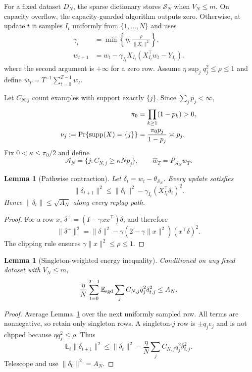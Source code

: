 \documentclass[letterpaper]{article}
\newtheorem{lemma}[theorem]{Lemma}
\newcommand{\E}{\mathbb E}
\newcommand{\cA}{\mathcal A}
\newcommand{\cS}{\mathcal S}
\newcommand{\1}{\mathbf 1}
\begin{document}
For a fixed dataset $D_N$, the sparse dictionary stores $\cS_N$ when
$V_N\le m$. On capacity overflow, the capacity-guarded algorithm outputs zero.
Otherwise, at update $t$ it samples $I_t$ uniformly from $\{1,\ldots,N\}$ and
uses
\begin{align*}
\gamma_i&=\min\left\{\eta,\frac{\rho}{\|X_i\|^2}\right\},\\
w_{t+1}&=w_t-\gamma_{I_t}X_{I_t}
(X_{I_t}^\top w_t-Y_{I_t}).
\end{align*}
where the second argument is $+\infty$ for a zero row. Assume
$\eta\sup_jq_j^2\le\rho\le1$ and define
$\bar w_T=T^{-1}\sum_{t=0}^{T-1}w_t$.

Let $C_{N,j}$ count examples with support exactly $\{j\}$. Since
$\sum_jp_j<\infty$,
\begin{align*}
\pi_0&=\prod_{k\ge1}(1-p_k)>0,\\
\nu_j:=\Pr\{{\rm supp}(X)=\{j\}\}
&=\frac{\pi_0p_j}{1-p_j}\asymp p_j.
\end{align*}
Fix $0<\kappa\le\pi_0/2$ and define
\[
\cA_N=\{j:C_{N,j}\ge\kappa Np_j\},
\qquad
\widehat w_T=P_{\cA_N}\bar w_T.
\]

\begin{lemma}[Pathwise contraction]
\label{lem:pathwise}
Let $\delta_t=w_t-\theta_{\cS_N}$. Every update satisfies
\[
\|\delta_{t+1}\|^2
\le
\|\delta_t\|^2-\gamma_{I_t}(X_{I_t}^\top\delta_t)^2.
\]
Hence $\|\delta_t\|\le\sqrt{A_N}$ along every replay path.
\end{lemma}

\begin{proof}
For a row $x$,
$\delta^+=(I-\gamma xx^\top)\delta$, and therefore
\[
\|\delta^+\|^2
=\|\delta\|^2-
\gamma(2-\gamma\|x\|^2)(x^\top\delta)^2.
\]
The clipping rule ensures $\gamma\|x\|^2\le\rho\le1$.
\end{proof}

\begin{lemma}[Singleton-weighted energy inequality]
\label{lem:energy}
Conditioned on any fixed dataset with $V_N\le m$,
\begin{equation}
\frac{\eta}{N}
\sum_{t=0}^{T-1}\E_{\rm sgd}
\sum_jC_{N,j}q_j^2\delta_{t,j}^2
\le A_N.
\label{eq:supp-energy}
\end{equation}
\end{lemma}

\begin{proof}
Average Lemma~\ref{lem:pathwise} over the next uniformly sampled row. All
terms are nonnegative, so retain only singleton rows. A singleton-$j$ row is
$\pm q_je_j$ and is not clipped because $\eta q_j^2\le\rho$. Thus
\[
\E_t\|\delta_{t+1}\|^2
\le\|\delta_t\|^2-
\frac\eta N\sum_jC_{N,j}q_j^2\delta_{t,j}^2.
\]
Telescope and use $\|\delta_0\|^2=A_N$.
\end{proof}
\end{document}
